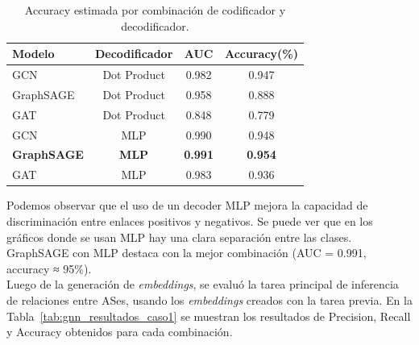 \begin{table}[t]
\centering
\begin{tabular}{lccc}
\hline
\textbf{Modelo} & \textbf{Decodificador} & \textbf{AUC}& \textbf{Accuracy(\%)} \\
\hline
GCN & Dot Product & 0.982 & 0.947 \\
GraphSAGE & Dot Product & 0.958 & 0.888 \\
GAT & Dot Product & 0.848 &  0.779 \\
GCN & MLP & 0.990 &  0.948 \\
\textbf{GraphSAGE} & \textbf{MLP} &  \textbf{0.991} & \textbf{0.954} \\
GAT & MLP &  0.983 &  0.936 \\
\hline
\end{tabular}
\caption{Accuracy estimada por combinación de codificador y decodificador.}
\label{tab:accuracy_gnn_full}
\end{table}

\newpage
Podemos observar que el uso de un decoder MLP mejora la capacidad de discriminación entre enlaces positivos y negativos. Se puede ver que en los gráficos donde se usan MLP hay una clara separación entre las clases. 
GraphSAGE con MLP destaca con la mejor combinación (AUC = 0.991, accuracy ≈ 95\%).\\


Luego de la generación de \textit{embeddings}, se evaluó la tarea principal de inferencia de relaciones entre ASes, usando los \textit{embeddings} creados con la tarea previa. En la Tabla~\ref{tab:gnn_resultados_caso1} se muestran los resultados de Precision, Recall y Accuracy obtenidos para cada combinación.\\


